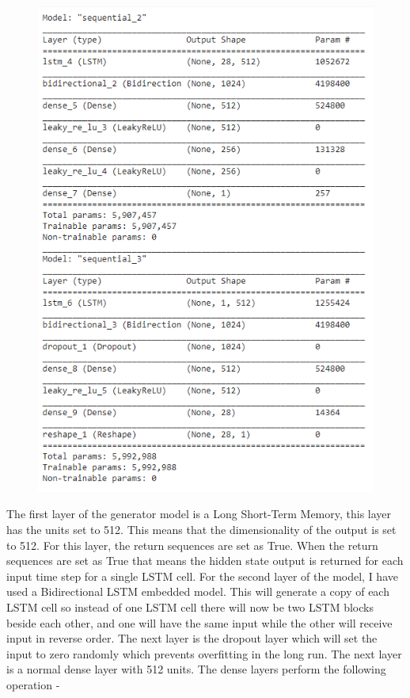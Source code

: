 \documentclass[oneside,12pt]{Classes/RoboticsLaTeX}
\begin{document}
\begin{figure}[H]
  \includegraphics[scale = 1.3]{Capture1}
  \centering
\end{figure}


The first layer of the generator model is a Long Short-Term Memory, this layer has the units set to 512. This means that the dimensionality of the output is set to 512. For this layer, the return sequences are set as True. When the return sequences are set as True that means the hidden state output is returned for each input time step for a single LSTM cell.
For the second layer of the model, I have used a Bidirectional LSTM embedded model. This will generate a copy of each LSTM cell so instead of one LSTM cell there will now be two LSTM blocks beside each other, and one will have the same input while the other will receive input in reverse order.
The next layer is the dropout layer which will set the input to zero randomly which prevents overfitting in the long run.
The next layer is a normal dense layer with 512 units. The dense layers perform the following operation -
\end{document}
